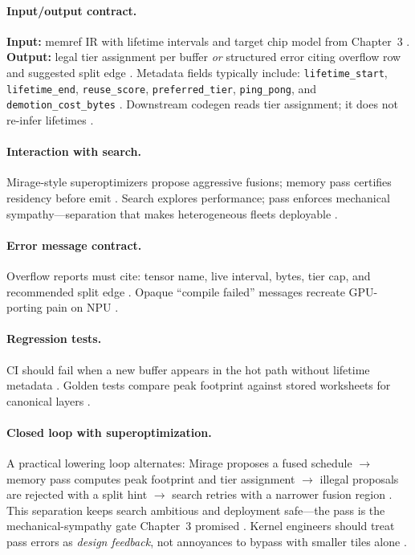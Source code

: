 \paragraph{Input/output contract.}
\textbf{Input:} memref IR with lifetime intervals and target chip model from Chapter~3 \citep{chen2020compilerbasedhardw,yirage2026}.
\textbf{Output:} legal tier assignment per buffer \emph{or} structured error citing overflow row and suggested split edge \citep{amd2024aie,nvidia2022hopper,patel2025llminference}.
Metadata fields typically include: \texttt{lifetime\_start}, \texttt{lifetime\_end}, \texttt{reuse\_score}, \texttt{preferred\_tier}, \texttt{ping\_pong}, and \texttt{demotion\_cost\_bytes} \citep{yirage2026,rotem2018glow}.
Downstream codegen reads tier assignment; it does not re-infer lifetimes \citep{wu2024mirage,chen2020compilerbasedhardw}.

\paragraph{Interaction with search.}
Mirage-style superoptimizers propose aggressive fusions; memory pass certifies residency before emit \citep{wu2024mirage,mpk2025,yirage2026}.
Search explores performance; pass enforces mechanical sympathy---separation that makes heterogeneous fleets deployable \citep{patel2025llminference,memoryfloor2026}.

\paragraph{Error message contract.}
Overflow reports must cite: tensor name, live interval, bytes, tier cap, and recommended split edge \citep{yirage2026,amd2024aie,nvidia2022hopper}.
Opaque ``compile failed'' messages recreate GPU-porting pain on NPU \citep{patel2025llminference,chen2020compilerbasedhardw}.

\paragraph{Regression tests.}
CI should fail when a new buffer appears in the hot path without lifetime metadata \citep{yirage2026,rotem2018glow}.
Golden tests compare peak footprint against stored worksheets for canonical layers \citep{wu2024mirage,mpk2025}.

\paragraph{Closed loop with superoptimization.}
A practical lowering loop alternates: Mirage proposes a fused schedule $\rightarrow$ memory pass computes peak footprint and tier assignment $\rightarrow$ illegal proposals are rejected with a split hint $\rightarrow$ search retries with a narrower fusion region \citep{wu2024mirage,yirage2026,mpk2025}.
This separation keeps search ambitious and deployment safe---the pass is the mechanical-sympathy gate Chapter~3 promised \citep{chen2020compilerbasedhardw,patel2025llminference}.
Kernel engineers should treat pass errors as \emph{design feedback}, not annoyances to bypass with smaller tiles alone \citep{memoryfloor2026,taxbreak2026}.


